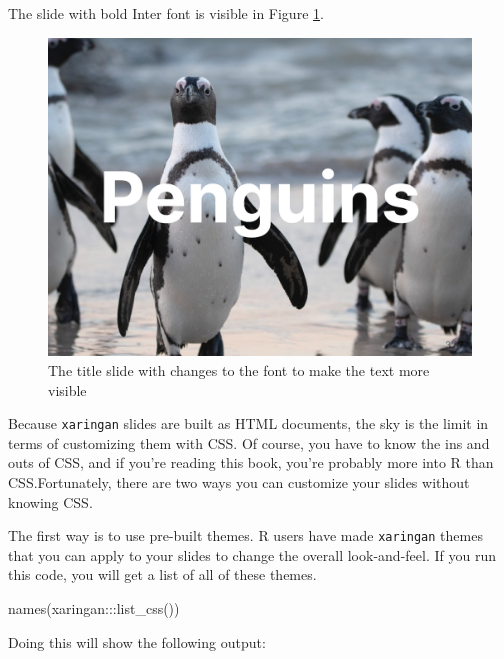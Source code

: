 \documentclass[
]{book}
\newenvironment{Shaded}{\begin{snugshade}}{\end{snugshade}}
\newcommand{\FunctionTok}[1]{\textcolor[rgb]{0.00,0.00,0.00}{#1}}
\newcommand{\NormalTok}[1]{#1}
\newcommand{\SpecialCharTok}[1]{\textcolor[rgb]{0.00,0.00,0.00}{#1}}
\begin{document}
The slide with bold Inter font is visible in Figure \ref{fig:penguins-report-inter}.

\begin{figure}
\includegraphics[width=1\linewidth]{assets/penguins-report-inter} \caption{The title slide with changes to the font to make the text more visible}\label{fig:penguins-report-inter}
\end{figure}

Because \texttt{xaringan} slides are built as HTML documents, the sky is the limit in terms of customizing them with CSS. Of course, you have to know the ins and outs of CSS, and if you're reading this book, you're probably more into R than CSS.Fortunately, there are two ways you can customize your slides without knowing CSS.

The first way is to use pre-built themes. R users have made \texttt{xaringan} themes that you can apply to your slides to change the overall look-and-feel. If you run this code, you will get a list of all of these themes.

\begin{Shaded}
\begin{Highlighting}[]
\FunctionTok{names}\NormalTok{(xaringan}\SpecialCharTok{:::}\FunctionTok{list\_css}\NormalTok{())}
\end{Highlighting}
\end{Shaded}

Doing this will show the following output:
\end{document}
